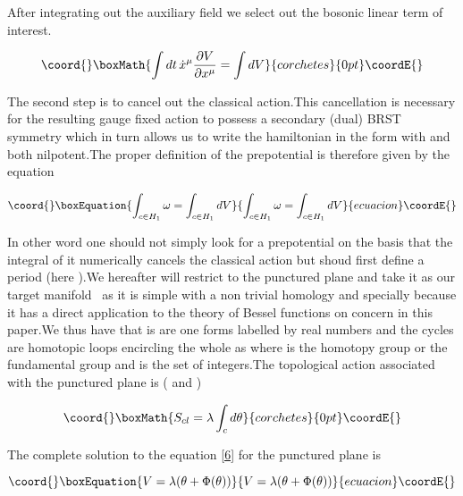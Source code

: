 \documentclass[a4paper,11pt]{article}
\begin{document}
After integrating out the auxiliary field \myHighlight{$\lambda $}\coordHE{} we select out the
bosonic linear term of interest.

\[\coord{}\boxMath{
\int dt\,\dot{x}^{\mu }\frac{\partial V}{\partial x^{\mu }}=\int dV 
}{corchetes}{0pt}\coordE{}\]

The second step is to cancel out the classical action.This cancellation is
necessary for the resulting gauge fixed action to possess a secondary (dual)
BRST symmetry \coordHE{} which in turn allows us to write the hamiltonian in
the form \coordHE{} with \coordHE{} and \coordHE{} both
nilpotent.The proper definition of the prepotential is therefore given by
the equation

\begin{equation}\coord{}\boxEquation{
\int_{c\in H_{1}}\omega =\int_{c\in H_{1}}dV  \label{6}
}{
\int_{c\in H_{1}}\omega =\int_{c\in H_{1}}dV  }{ecuacion}\coordE{}\end{equation}

In other word one should not simply look for a prepotential on the basis
that the integral of it numerically cancels the classical action but shoud
first define a period (here \coordHE{}).We hereafter will restrict to the
punctured plane \coordHE{}and take it as our target manifold \ as it is
simple with a non trivial homology and specially because it has a direct
application to the theory of Bessel functions on concern in this paper.We
thus have \coordHE{} that is \coordHE{}are one forms
labelled by real numbers and the cycles \coordHE{} are homotopic loops
encircling the whole as \coordHE{} where \myHighlight{$\Pi $}\coordHE{} is the
homotopy group or the fundamental group and \coordHE{} is the set of integers.The
topological action associated with the punctured plane is ( \coordHE{}
and \coordHE{})

\[\coord{}\boxMath{
S_{cl}=\lambda \int_{c}d\theta 
}{corchetes}{0pt}\coordE{}\]

The complete solution to the equation \ref{6} for the punctured plane is

\begin{equation}\coord{}\boxEquation{
V=\lambda (\theta +\Phi (\theta ))  \label{8}
}{
V=\lambda (\theta +\Phi (\theta ))  }{ecuacion}\coordE{}\end{equation}
\end{document}
